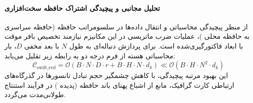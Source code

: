 \paragraph{تحلیل مجانبی و پیچیدگی اشتراک حافظه سخت‌افزاری}
از منظر پیچیدگی محاسباتی و انتقال داده‌ها در سلسومراتب حافظه (حافظه سراسری  به حافظه محلی )، عملیات ضرب ماتریسی در این مکانیزم نیازمند تخصیص بافر موقت با ابعاد فاکتورگیری‌شده است. برای پردازش دنباله‌ای به طول $N$ با بعد مخفی $D$، بار محاسباتی هسته از فرم درجه دو به رابطه زیر تقلیل می‌یابد:
\begin{equation}
\label{eq:complexity_swift_svd}
\mathcal{C}_{\text{swift\_svd}} = \mathcal{O}\left( B \cdot N \cdot D \cdot r + B \cdot H \cdot N \cdot d_k \right) \ll \mathcal{O}\left( B \cdot H \cdot N^2 \cdot d_k \right)
\end{equation}
این بهبود مرتبه پیچیدگی، با کاهش چشمگیر حجم تبادل تانسورها در گذرگاه‌های ارتباطی کارت گرافیک، مانع از اشباع پهنای باند حافظه (پدیده ) در فرآیند استنتاج طولانی‌مدت می‌گردد.
